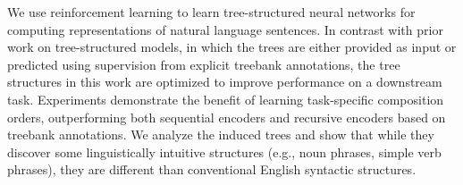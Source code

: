 We use reinforcement learning to learn tree-structured neural networks for computing representations of natural language sentences. In contrast with prior work on tree-structured models, in which the trees are either provided as input or predicted using supervision from explicit treebank annotations, the tree structures in this work are optimized to improve performance on a downstream task. Experiments demonstrate the benefit of learning task-specific composition orders, outperforming both sequential encoders and recursive encoders based on treebank annotations. We analyze the induced trees and show that while they discover some linguistically intuitive structures (e.g., noun phrases, simple verb phrases), they are different than conventional English syntactic structures.
